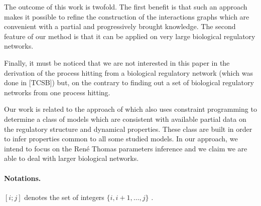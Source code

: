 The outcome of this work is twofold. The first benefit is that such an approach makes it possible to refine the construction of the interactions graphs which are convenient with a partial and progressively brought knowledge. The second feature of our method is that it can be applied on very large biological regulatory networks.

Finally, it must be noticed that we are not interested in this paper in the derivation of the process hitting from a biological regulatory network (which was done in [TCSB]) but, on the contrary to finding out a set of biological regulatory networks from one process hitting.

Our work is related to the approach of \cite{20646302,DBLP:conf/ipcat/CorblinFTCT12} which also uses constraint programming to determine a class of models which are consistent with available partial data on the regulatory structure and dynamical properties. These class are built in order to infer properties common to all some studied models. In our approach, we intend to focus on the Ren\'e Thomas parameters inference and we claim we are able to deal with larger biological networks.

\medskip
\paragraph{Notations.}
$[i;j]$ denotes the set of integers $\{ i, i+1, \dots, j \}$
.
 
